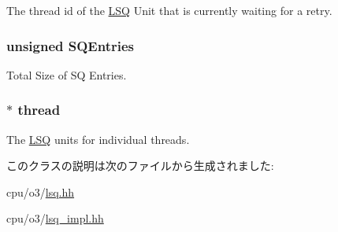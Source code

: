 \label{classLSQ_a865aaad70625f17392c717930860d386}
The thread id of the \hyperlink{classLSQ}{LSQ} Unit that is currently waiting for a retry. \hypertarget{classLSQ_a38c8af5392da70119dc5cce4e3637cbc}{
\subsubsection[{SQEntries}]{\setlength{\rightskip}{0pt plus 5cm}unsigned {\bf SQEntries}}}
\label{classLSQ_a38c8af5392da70119dc5cce4e3637cbc}
Total Size of SQ Entries. \hypertarget{classLSQ_a5709dc03226b4fc5a49a4c6a41ff50ad}{
\subsubsection[{thread}]{$\ast$ {\bf thread}}}
\label{classLSQ_a5709dc03226b4fc5a49a4c6a41ff50ad}
The \hyperlink{classLSQ}{LSQ} units for individual threads. 

このクラスの説明は次のファイルから生成されました:\begin{DoxyCompactItemize}
\item 
cpu/o3/\hyperlink{lsq_8hh}{lsq.hh}\item 
cpu/o3/\hyperlink{lsq__impl_8hh}{lsq\_\-impl.hh}\end{DoxyCompactItemize}
